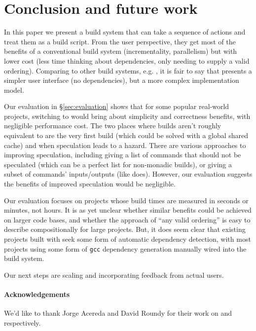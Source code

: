 \section{Conclusion and future work}
\label{sec:conclusion}

In this paper we present a build system that can take a sequence of actions and treat them as a build script. From the user perspective, they get most of the benefits of a conventional build system (incrementality, parallelism) but with lower cost (less time thinking about dependencies, only needing to supply a valid ordering). Comparing \Rattle to other build systems, e.g. \Make, it is fair to say that \Rattle presents a simpler user interface (no dependencies), but a more complex implementation model.

Our evaluation in \S\ref{sec:evaluation} shows that for some popular real-world projects, switching to \Rattle would bring about simplicity and correctness benefits, with negligible performance cost. The two places where builds aren't roughly equivalent to \Make are the very first build (which could be solved with a global shared cache) and when speculation leads to a hazard. There are various approaches to improving speculation, including giving \Rattle a list of commands that should not be speculated (which can be a perfect list for non-monadic builds), or giving \Rattle a subset of commands' inputs/outputs (like \Fac does). However, our evaluation suggests the benefits of improved speculation would be negligible.

Our evaluation focuses on projects whose build times are measured in seconds or minutes, not hours. It is as yet unclear whether similar benefits could be achieved on larger code bases, and whether the \Rattle approach of ``any valid ordering'' is easy to describe compositionally for large projects.  But, it does seem clear that existing projects built with \Make seek some form of automatic dependency detection, with most projects using some form of \texttt{gcc} dependency generation manually wired into the build system.

Our next steps are scaling \Rattle and incorporating feedback from actual users.

\paragraph{Acknowledgements} We'd like to thank Jorge Acereda and David Roundy for their work on \Fsatrace and \Bigbro respectively.
